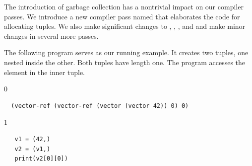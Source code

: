 \documentclass[7x10]{TimesAPriori_MIT}%
\def\racketEd{0}
\def\pythonEd{1}
\def\edition{1}
\newcommand{\pythonColor}[0]{}
\newtheorem{exercise}[theorem]{Exercise}
\numberwithin{theorem}{chapter}
\numberwithin{definition}{chapter}
\numberwithin{equation}{chapter}
\begin{document}

The introduction of garbage collection has a nontrivial impact on our
compiler passes. We introduce a new compiler pass named
 that elaborates the code for allocating
tuples. We also make significant changes to
, ,
, and  and
make minor changes in several more passes.

The following program serves as our running example.  It creates
two tuples, one nested inside the other. Both tuples have length
one. The program accesses the element in the inner tuple.
{\if\edition\racketEd
\begin{lstlisting}
  (vector-ref (vector-ref (vector (vector 42)) 0) 0)
\end{lstlisting}
\fi}
{\if\edition\pythonEd\pythonColor
\begin{lstlisting}
   v1 = (42,)
   v2 = (v1,)
   print(v2[0][0])
\end{lstlisting}
\fi}
\end{document}
